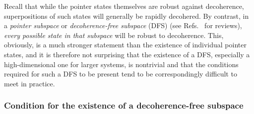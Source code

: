 \documentclass[3p,sort&compress,12pt]{elsarticle}
\begin{document}
Recall that while the pointer states themselves are robust against decoherence, superpositions of such states will generally be rapidly decohered. By contrast, in a \emph{pointer subspace} \cite{Zurek:1982:tv} or \emph{decoherence-free subspace} (DFS) \cite{Palma:1996:yy,Lidar:1998:uu,Zanardi:1997:yy,Zanardi:1997:tv,Zanardi:1998:oo,Lidar:1999:fa,Bacon:2000:yy,Duan:1998:yb,Zanardi:2001:oo,Knill:2000:aa} (see Refs.~\cite{Lidar:2003:aa,Lidar:2014:pp} for reviews), \emph{every possible state in that subspace} will be robust to decoherence. This, obviously, is a much stronger statement than the existence of individual pointer states, and it is therefore not surprising that the existence of a DFS, especially a high-dimensional one for larger systems, is nontrivial and that the conditions required for such a DFS to be present tend to be correspondingly difficult to meet in practice. 

\subsubsection{Condition for the existence of a decoherence-free subspace} 
\end{document}
